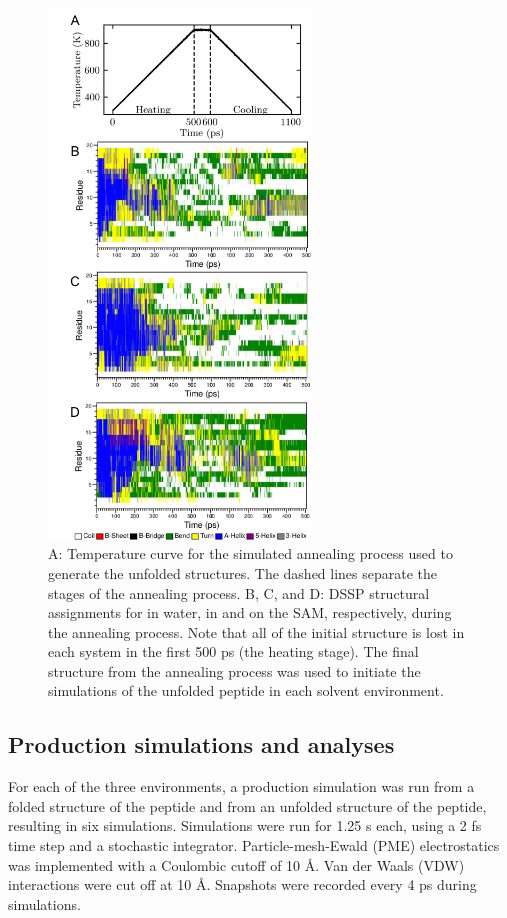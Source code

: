 \begin{figure}
    \center
    \includegraphics[width=2.75in]{figures-helix/unfolding.png}
    \caption{
        A: Temperature curve for the simulated annealing process used to generate the unfolded structures. 
        The dashed lines separate the stages of the annealing process. 
        B, C, and D: DSSP structural assignments for \pep{} in water, in \tbawat{} and on the SAM, respectively, during the annealing process. 
        Note that all of the initial structure is lost in each system in the first 500 ps (the heating stage). 
        The final structure from the annealing process was used to initiate the simulations of the unfolded peptide in each solvent environment.
    }
    \label{fig:helix-anneal}
\end{figure}

\subsection{Production simulations and analyses}

For each of the three environments, a production simulation was run from a folded structure of the peptide and from an unfolded structure of the peptide, resulting in six simulations. 
Simulations were run for 1.25 \textmu{}s each, using a 2 fs time step and a stochastic integrator. Particle-mesh-Ewald (PME) electrostatics was implemented with a Coulombic cutoff of 10 \si{\angstrom}. 
Van der Waals (VDW) interactions were cut off at 10 \si{\angstrom}. 
Snapshots were recorded every 4 ps during simulations.

